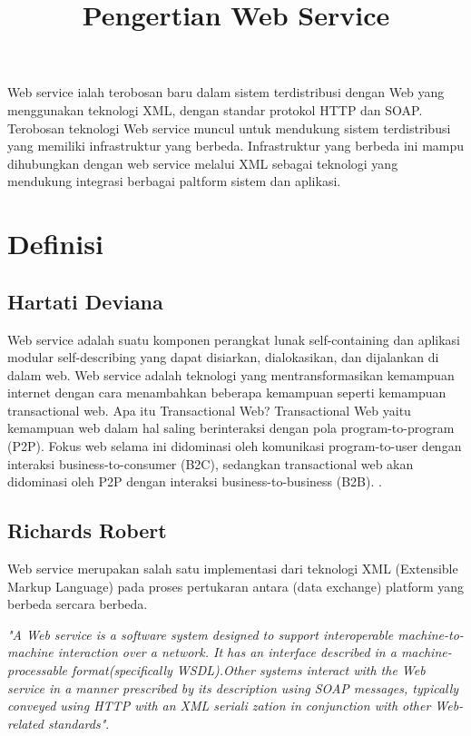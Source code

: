 \documentclass[12pt]{article}
\begin{document}
\title{Pengertian Web Service}
\maketitle

Web service ialah terobosan baru dalam sistem terdistribusi dengan Web yang menggunakan teknologi XML, dengan standar protokol  HTTP dan SOAP. Terobosan teknologi Web service muncul untuk mendukung sistem terdistribusi yang memiliki infrastruktur yang berbeda. Infrastruktur yang berbeda ini mampu dihubungkan dengan web service melalui XML sebagai teknologi yang mendukung integrasi berbagai paltform sistem dan aplikasi.

\section{Definisi}

\subsection{Hartati Deviana}
	Web service adalah suatu komponen perangkat lunak self-containing dan aplikasi modular self-describing yang dapat disiarkan, dialokasikan, dan dijalankan di dalam web. Web service adalah teknologi yang mentransformasikan kemampuan internet dengan cara menambahkan beberapa kemampuan seperti kemampuan transactional web. Apa itu Transactional Web? Transactional Web yaitu kemampuan web dalam hal saling berinteraksi dengan pola program-to-program (P2P). Fokus web selama ini didominasi oleh komunikasi program-to-user dengan interaksi business-to-consumer (B2C), sedangkan transactional web akan didominasi oleh P2P dengan interaksi business-to-business (B2B). \cite{deviana2013penerapan}.

\subsection{Richards Robert}

Web service merupakan salah satu implementasi dari teknologi XML (Extensible Markup Language) pada proses pertukaran antara (data exchange) platform yang berbeda sercara berbeda.

\textit{"A Web service is a software system designed to support interoperable machine-to-machine interaction over a network. It has an interface described in a machine-processable format(specifically WSDL).Other systems interact with the Web service in a manner prescribed by its description using SOAP messages, typically conveyed using HTTP with an XML seriali zation in conjunction with other Web-related standards"}.
\end{document}
